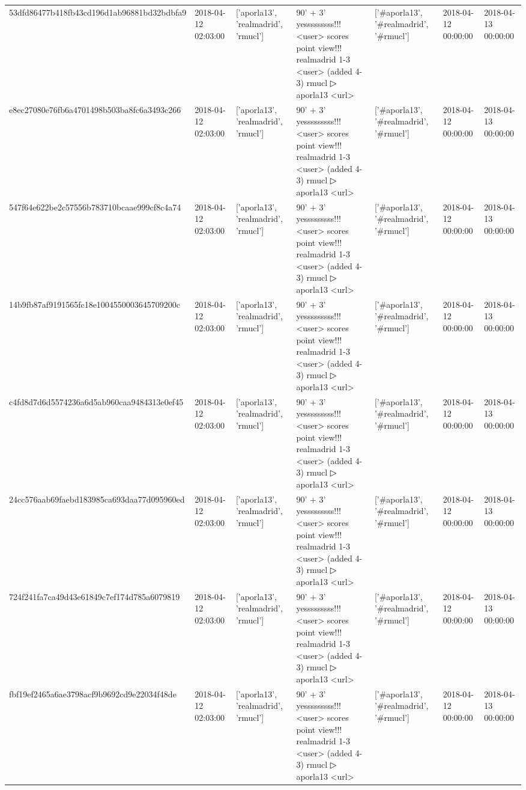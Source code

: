 \begin{tabular}{lllllll}
53dfd86477b418fb43cd196d1ab96881bd32bdbfa9 & 2018-04-12 02:03:00 & ['aporla13', 'realmadrid', 'rmucl'] & 90' + 3' yesssssssss!!! <user> scores point view!!! realmadrid 1-3 <user> (added 4-3) rmucl ▷ aporla13 <url> & ['#aporla13', '#realmadrid', '#rmucl'] & 2018-04-12 00:00:00 & 2018-04-13 00:00:00 \\
e8ec27080e76fb6a4701498b503ba8fc6a3493c266 & 2018-04-12 02:03:00 & ['aporla13', 'realmadrid', 'rmucl'] & 90' + 3' yesssssssss!!! <user> scores point view!!! realmadrid 1-3 <user> (added 4-3) rmucl ▷ aporla13 <url> & ['#aporla13', '#realmadrid', '#rmucl'] & 2018-04-12 00:00:00 & 2018-04-13 00:00:00 \\
547f64e622be2c57556b783710bcaae999cf8c4a74 & 2018-04-12 02:03:00 & ['aporla13', 'realmadrid', 'rmucl'] & 90' + 3' yesssssssss!!! <user> scores point view!!! realmadrid 1-3 <user> (added 4-3) rmucl ▷ aporla13 <url> & ['#aporla13', '#realmadrid', '#rmucl'] & 2018-04-12 00:00:00 & 2018-04-13 00:00:00 \\
14b9fb87af9191565fc18e1004550003645709200c & 2018-04-12 02:03:00 & ['aporla13', 'realmadrid', 'rmucl'] & 90' + 3' yesssssssss!!! <user> scores point view!!! realmadrid 1-3 <user> (added 4-3) rmucl ▷ aporla13 <url> & ['#aporla13', '#realmadrid', '#rmucl'] & 2018-04-12 00:00:00 & 2018-04-13 00:00:00 \\
c4fd8d7d6d5574236a6d5ab960caa9484313e0ef45 & 2018-04-12 02:03:00 & ['aporla13', 'realmadrid', 'rmucl'] & 90' + 3' yesssssssss!!! <user> scores point view!!! realmadrid 1-3 <user> (added 4-3) rmucl ▷ aporla13 <url> & ['#aporla13', '#realmadrid', '#rmucl'] & 2018-04-12 00:00:00 & 2018-04-13 00:00:00 \\
24cc576aab69faebd183985ca693daa77d095960ed & 2018-04-12 02:03:00 & ['aporla13', 'realmadrid', 'rmucl'] & 90' + 3' yesssssssss!!! <user> scores point view!!! realmadrid 1-3 <user> (added 4-3) rmucl ▷ aporla13 <url> & ['#aporla13', '#realmadrid', '#rmucl'] & 2018-04-12 00:00:00 & 2018-04-13 00:00:00 \\
724f241fa7ca49d43e61849c7ef174d785a6079819 & 2018-04-12 02:03:00 & ['aporla13', 'realmadrid', 'rmucl'] & 90' + 3' yesssssssss!!! <user> scores point view!!! realmadrid 1-3 <user> (added 4-3) rmucl ▷ aporla13 <url> & ['#aporla13', '#realmadrid', '#rmucl'] & 2018-04-12 00:00:00 & 2018-04-13 00:00:00 \\
fbf19ef2465a6ae3798acf9b9692cd9e22034f48de & 2018-04-12 02:03:00 & ['aporla13', 'realmadrid', 'rmucl'] & 90' + 3' yesssssssss!!! <user> scores point view!!! realmadrid 1-3 <user> (added 4-3) rmucl ▷ aporla13 <url> & ['#aporla13', '#realmadrid', '#rmucl'] & 2018-04-12 00:00:00 & 2018-04-13 00:00:00 \\

\end{tabular}
